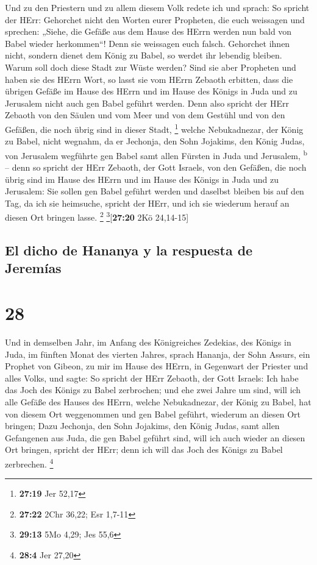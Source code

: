  Und zu den Priestern und zu allem diesem Volk redete ich
und sprach: So spricht der HErr: Gehorchet nicht den Worten eurer
Propheten, die euch weissagen und sprechen: „Siehe, die Gefäße aus dem
Hause des HErrn werden nun bald von Babel wieder herkommen``! Denn sie
weissagen euch falsch.  Gehorchet ihnen nicht, sondern
dienet dem König zu Babel, so werdet ihr lebendig bleiben. Warum soll
doch diese Stadt zur Wüste werden?  Sind sie aber
Propheten und haben sie des HErrn Wort, so lasst sie vom HErrn Zebaoth
erbitten, dass die übrigen Gefäße im Hause des HErrn und im Hause des
Königs in Juda und zu Jerusalem nicht auch gen Babel geführt werden.
 Denn also spricht der HErr Zebaoth von den Säulen und
vom Meer und von dem Gestühl und von den Gefäßen, die noch übrig sind in
dieser Stadt, \footnote{\textbf{27:19} Jer 52,17}  welche
Nebukadnezar, der König zu Babel, nicht wegnahm, da er Jechonja, den
Sohn Jojakims, den König Judas, von Jerusalem wegführte gen Babel samt
allen Fürsten in Juda und Jerusalem, \textsuperscript{b} 
-- denn so spricht der HErr Zebaoth, der Gott Israels, von den Gefäßen,
die noch übrig sind im Hause des HErrn und im Hause des Königs in Juda
und zu Jerusalem:  Sie sollen gen Babel geführt werden
und daselbst bleiben bis auf den Tag, da ich sie heimsuche, spricht der
HErr, und ich sie wiederum herauf an diesen Ort bringen lasse.
\footnote{\textbf{27:22} 2Chr 36,22; Esr 1,7-11}
\footnote{\textbf{29:13} 5Mo 4,29; Jes 55,6}{[}\textbf{27:20} 2Kö
24,14-15{]}

\hypertarget{el-dicho-de-hananya-y-la-respuesta-de-jeremuxedas}{%
\subsection{El dicho de Hananya y la respuesta de
Jeremías}\label{el-dicho-de-hananya-y-la-respuesta-de-jeremuxedas}}

\hypertarget{section-27}{%
\section{28}\label{section-27}}

 Und in demselben Jahr, im Anfang des Königreiches
Zedekias, des Königs in Juda, im fünften Monat des vierten Jahres,
sprach Hananja, der Sohn Assurs, ein Prophet von Gibeon, zu mir im Hause
des HErrn, in Gegenwart der Priester und alles Volks, und sagte:
 So spricht der HErr Zebaoth, der Gott Israels: Ich habe
das Joch des Königs zu Babel zerbrochen;  und ehe zwei
Jahre um sind, will ich alle Gefäße des Hauses des HErrn, welche
Nebukadnezar, der König zu Babel, hat von diesem Ort weggenommen und gen
Babel geführt, wiederum an diesen Ort bringen;  Dazu
Jechonja, den Sohn Jojakims, den König Judas, samt allen Gefangenen aus
Juda, die gen Babel geführt sind, will ich auch wieder an diesen Ort
bringen, spricht der HErr; denn ich will das Joch des Königs zu Babel
zerbrechen. \footnote{\textbf{28:4} Jer 27,20}

